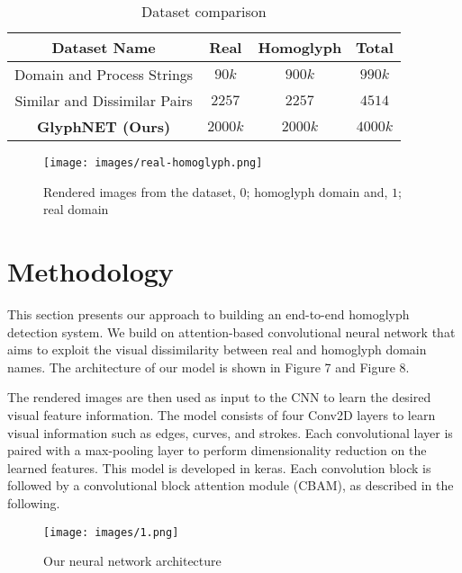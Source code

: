\documentclass[letterpaper]{article} \usepackage{aaai22}  \usepackage{times}  \usepackage{helvet}  \usepackage{courier}  \usepackage[hyphens]{url}  \usepackage{graphicx} \urlstyle{rm} \def\UrlFont{\rm}  \usepackage{natbib}  \usepackage{caption} \DeclareCaptionStyle{ruled}{labelfont=normalfont,labelsep=colon,strut=off} \frenchspacing  \setlength{\pdfpagewidth}{8.5in}  \setlength{\pdfpageheight}{11in}  \usepackage{algorithm}
\begin{document}
\begin{table*}[!ht]
    \centering
    \begin{tabular}{|c|c|c|c|} \hline
         \textbf{Dataset Name} & \textbf{Real} & \textbf{Homoglyph} & \textbf{Total} \\ \hline
         Domain and Process Strings\cite{woodbridge2018detecting}& $90k$ & $900k$ & $990k$ \\ \hline
         Similar and Dissimilar Pairs\cite{majumder2020convolutional} & $2257$ & $2257$ & $4514$ \\ \hline
         \textbf{GlyphNET (Ours)} & \textbf{$2000k$} & \textbf{$2000k$} & \textbf{$4000k$}\\ \hline
    \end{tabular}
    \caption{Dataset comparison}
    \label{tab:my_label}
\end{table*}

\begin{figure}
    \texttt{[image: images/real-homoglyph.png]}
    \caption{Rendered images from the dataset, $0$; homoglyph domain and, $1$; real domain}
    \label{fig5}
\end{figure}



\section{Methodology}

This section presents our approach to building an end-to-end homoglyph detection system. We build on attention-based\cite{bahdanau2014neural}\cite{vaswani2017attention} convolutional neural network\cite{lecun1995convolutional} that aims to exploit the visual dissimilarity between real and homoglyph domain names. The architecture of our model is shown in Figure 7 and Figure 8.

The rendered images are then used as input to the CNN to learn the desired visual feature information. The model consists of four Conv2D layers to learn visual information such as edges, curves, and strokes. Each convolutional layer is paired with a max-pooling layer to perform dimensionality reduction on the learned features. This model is developed in keras\cite{chollet2015keras}. Each convolution block is followed by a convolutional block attention module (CBAM), as described in the following.


\begin{figure*}[!ht]
  \texttt{[image: images/1.png]}
  \caption{Our neural network architecture}
\end{figure*}
\end{document}
